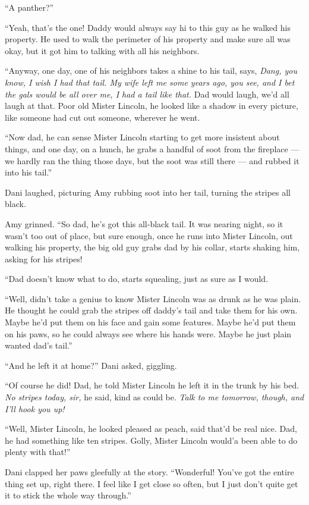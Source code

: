 ``A panther?''

``Yeah, that's the one! Daddy would always say hi to this guy as he walked his property. He used to walk the perimeter of his property and make sure all was okay, but it got him to talking with all his neighbors.

``Anyway, one day, one of his neighbors takes a shine to his tail, says, \emph{Dang, you know, I wish I had that tail. My wife left me some years ago, you see, and I bet the gals would be all over me, I had a tail like that.} Dad would laugh, we'd all laugh at that. Poor old Mister Lincoln, he looked like a shadow in every picture, like someone had cut out someone, wherever he went.

``Now dad, he can sense Mister Lincoln starting to get more insistent about things, and one day, on a hunch, he grabs a handful of soot from the fireplace --- we hardly ran the thing those days, but the soot was still there --- and rubbed it into his tail.''

Dani laughed, picturing Amy rubbing soot into her tail, turning the stripes all black.

Amy grinned. ``So dad, he's got this all-black tail. It was nearing night, so it wasn't too out of place, but sure enough, once he runs into Mister Lincoln, out walking his property, the big old guy grabs dad by his collar, starts shaking him, asking for his stripes!

``Dad doesn't know what to do, starts squealing, just as sure as I would.

``Well, didn't take a genius to know Mister Lincoln was as drunk as he was plain. He thought he could grab the stripes off daddy's tail and take them for his own. Maybe he'd put them on his face and gain some features. Maybe he'd put them on his paws, so he could always see where his hands were. Maybe he just plain wanted dad's tail.''

``And he left it at home?'' Dani asked, giggling.

``Of course he did! Dad, he told Mister Lincoln he left it in the trunk by his bed. \emph{No stripes today, sir,} he said, kind as could be. \emph{Talk to me tomorrow, though, and I'll hook you up!}

``Well, Mister Lincoln, he looked pleased as peach, said that'd be real nice. Dad, he had something like ten stripes. Golly, Mister Lincoln would'a been able to do plenty with that!''

Dani clapped her paws gleefully at the story. ``Wonderful! You've got the entire thing set up, right there. I feel like I get close so often, but I just don't quite get it to stick the whole way through.''

